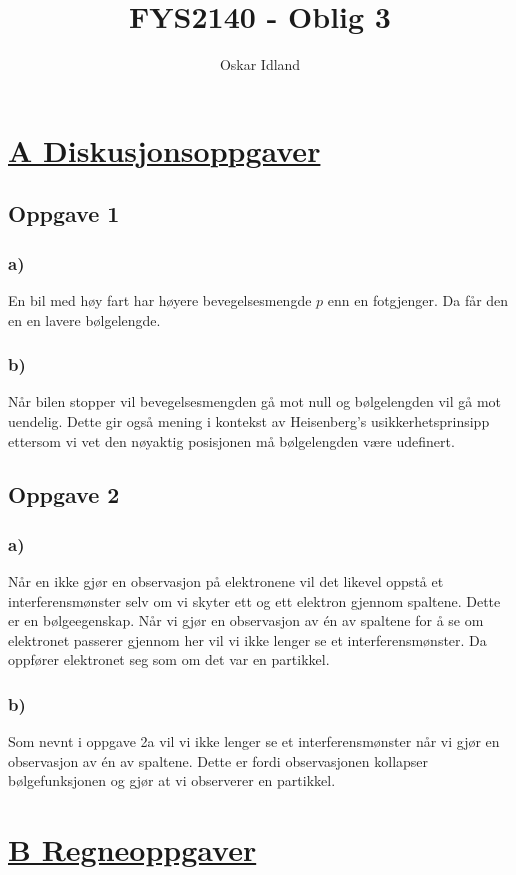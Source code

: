\documentclass{article}
\author{Oskar Idland}
\title{FYS2140 - Oblig 3}
\date{}
\begin{document}
\maketitle
\newpage

\section*{\underline{A Diskusjonsoppgaver}}
\subsection*{Oppgave 1}
\subsubsection*{a)}
En bil med høy fart har høyere bevegelsesmengde $p$ enn en fotgjenger. Da får den en en lavere bølgelengde. 
\subsubsection*{b)}
Når bilen stopper vil bevegelsesmengden gå mot null og bølgelengden vil gå mot uendelig. Dette gir også mening i kontekst av Heisenberg's usikkerhetsprinsipp ettersom vi vet den nøyaktig posisjonen må bølgelengden være udefinert. 

\subsection*{Oppgave 2}
\subsubsection*{a)}
Når en ikke gjør en observasjon på elektronene vil det likevel oppstå et interferensmønster selv om vi skyter ett og ett elektron gjennom spaltene. Dette er en bølgeegenskap. Når vi gjør en observasjon av én av spaltene for å se om elektronet passerer gjennom her vil vi ikke lenger se et interferensmønster. Da oppfører elektronet seg som om det var en partikkel.  

\subsubsection*{b)}
Som nevnt i oppgave 2a vil vi ikke lenger se et interferensmønster når vi gjør en observasjon av én av spaltene. Dette er fordi observasjonen kollapser bølgefunksjonen og gjør at vi observerer en partikkel. 

\section*{\underline{B Regneoppgaver}}
\end{document}
